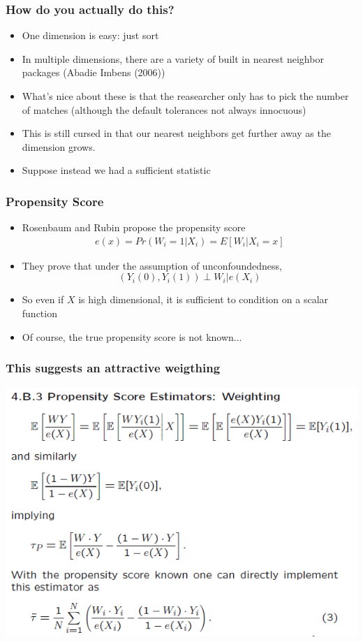 \begin{frame}
\frametitle{How do you actually do this?}  
\begin{itemize}
  \item One dimension is easy: just sort 
  \item In multiple dimensions, there are a variety of built in nearest neighbor packages (Abadie Imbens (2006))
  \item What's nice about these is that the reasearcher only has to pick the number of matches (although the default tolerances not always innocuous)
  \item This is still cursed in that our nearest neighbors get further away as the dimension grows.
  \item Suppose instead we had a \alert{sufficient statistic}
\end{itemize}
\end{frame}

\begin{frame}
\frametitle{Propensity Score}
\begin{itemize}
\item Rosenbaum and Rubin propose the \alert{propensity score}
\begin{eqnarray*}
e(x) = Pr(W_i  = 1 | X_i) = E[W_i | X_i = x]
\end{eqnarray*}
\item They prove that under the assumption of unconfoundedness, 
  $$ (Y_i(0),Y_i(1)) \perp W_i | e(X_i) $$ 
\item So even if $X$ is high dimensional, it is sufficient to condition on a scalar function 
\item Of course, the true propensity score is not known... 
\end{itemize}
\end{frame}

\begin{frame}
  \frametitle{This suggests an attractive weigthing}
  \begin{center}
    \includegraphics[scale=0.55]{./resources/imbensAEAPsWeight}
  \end{center}  
\end{frame}

